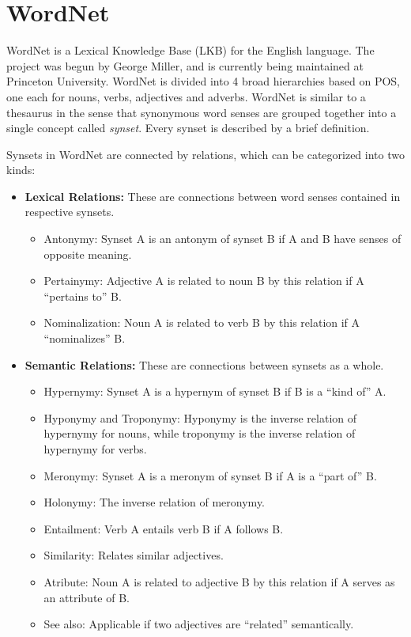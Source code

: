 \section{WordNet}
WordNet is a Lexical Knowledge Base (LKB) for the English language. The project was begun by George Miller, and is currently being maintained at Princeton University. WordNet is divided into 4 broad hierarchies based on POS, one each for nouns, verbs, adjectives and adverbs. WordNet is similar to a thesaurus in the sense that synonymous word senses are grouped together into a single concept called {\em synset}. Every synset is described by a brief definition.

Synsets in WordNet are connected by relations, which can be categorized into two kinds:
\begin{itemize}
 \item \textbf{Lexical Relations:} These are connections between word senses contained in respective synsets.
 \begin{itemize}
  \item Antonymy: Synset A is an antonym of synset B if A and B have senses of opposite meaning.
  \item Pertainymy: Adjective A is related to noun B by this relation if A ``pertains to'' B.  
  \item Nominalization: Noun A is related to verb B by this relation if A ``nominalizes'' B.
 \end{itemize}
 \item \textbf{Semantic Relations:} These are connections between synsets as a whole.
 \begin{itemize}
  \item Hypernymy: Synset A is a hypernym of synset B if B is a ``kind of'' A.
  \item Hyponymy and Troponymy: Hyponymy is the inverse relation of hypernymy for nouns, while troponymy is the inverse relation of hypernymy for verbs.
  \item Meronymy: Synset A is a meronym of synset B if A is a ``part of'' B.
  \item Holonymy: The inverse relation of meronymy.
  \item Entailment: Verb A entails verb B if A follows B.
  \item Similarity: Relates similar adjectives.
  \item Atribute: Noun A is related to adjective B by this relation if A serves as an attribute of B.
  \item See also: Applicable if two adjectives are ``related'' semantically.
 \end{itemize}
\end{itemize}


